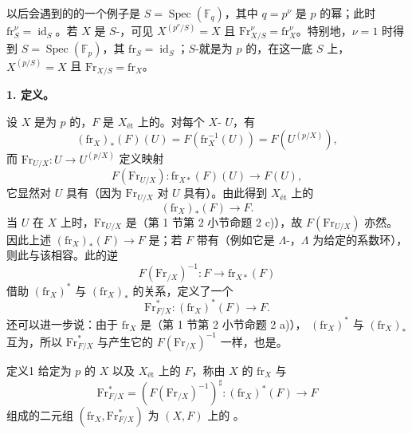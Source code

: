 以后会遇到的的一个例子是 $S=\operatorname{Spec}(\mathbb F_q)$，其中 $q=p^\nu$ 是 $p$ 的幂；此时 $\mathrm{fr}_S^\nu=\operatorname{id}_S$。若 $X$ 是 $S$-，可见
$X^{(p^\nu/S)}=X$ 且 $\mathrm{Fr}_{X/S}^{\nu}=\mathrm{fr}_X^\nu$。特别地，$\nu=1$ 时得到 $S=\operatorname{Spec}(\mathbb F_p)$，其 $\mathrm{fr}_S=\operatorname{id}_S$；$S$-就是为 $p$ 的，在这一底 $S$ 上，$X^{(p/S)}=X$ 且 $\mathrm{Fr}_{X/S}=\mathrm{fr}_X$。

\textbf{1. 定义。}

设 $X$ 是为 $p$ 的，$F$ 是 $X_{\text{ét}}$ 上的。对每个 $X$- $U$，有
\[
(\mathrm{fr}_X)_*(F)(U)=F(\mathrm{fr}_X^{-1}(U))=F(U^{(p/X)}),
\]
而 $\mathrm{Fr}_{U/X}:U\to U^{(p/X)}$ 定义映射
\[
F(\mathrm{Fr}_{U/X}):\mathrm{fr}_{X*}(F)(U)\longrightarrow F(U),
\]
它显然对 $U$ 具有（因为 $\mathrm{Fr}_{U/X}$ 对 $U$ 具有）。由此得到 $X_{\text{ét}}$ 上的
\[
(\mathrm{fr}_X)_*(F)\longrightarrow F.
\]
当 $U$ 在 $X$ 上时，$\mathrm{Fr}_{U/X}$ 是（第 1 节第 2 小节命题 2 c)），故 $F(\mathrm{Fr}_{U/X})$ 亦然。因此上述 $(\mathrm{fr}_X)_*(F)\to F$ 是；若 $F$ 带有（例如它是 $\Lambda$-，$\Lambda$ 为给定的系数环），则此与该相容。此的逆
\[
F(\mathrm{Fr}_{/X})^{-1}:F\longrightarrow\mathrm{fr}_{X*}(F)
\]
借助 $(\mathrm{fr}_X)^*$ 与 $(\mathrm{fr}_X)_*$ 的关系，定义了一个
\[
\mathrm{Fr}_{F/X}^{*}:(\mathrm{fr}_X)^*(F)\longrightarrow F.
\]
还可以进一步说：由于 $\mathrm{fr}_X$ 是（第 1 节第 2 小节命题 2 a)）， $(\mathrm{fr}_X)^*$ 与 $(\mathrm{fr}_X)_*$ 互为，所以 $\mathrm{Fr}_{F/X}^{*}$ 与产生它的 $F(\mathrm{Fr}_{/X})^{-1}$ 一样，也是。
\begin{SGAresult}{定义}{1}
给定为 $p$ 的 $X$ 以及 $X_{\text{ét}}$ 上的 $F$，称由 $X$ 的 $\mathrm{fr}_X$ 与
\[
\mathrm{Fr}_{F/X}^{*}=(F(\mathrm{Fr}_{/X})^{-1})^{\sharp}:
(\mathrm{fr}_X)^*(F)\longrightarrow F
\]
组成的二元组 $(\mathrm{fr}_X,\mathrm{Fr}_{F/X}^{*})$ 为 $(X,F)$ 上的 。
\end{SGAresult}

